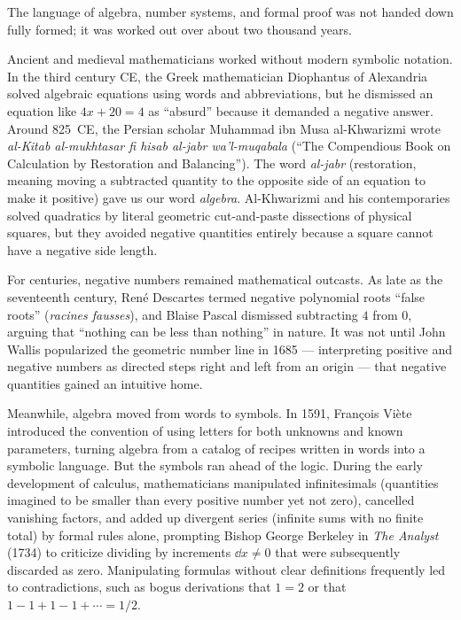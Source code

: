 \begin{historybox}
The language of algebra, number systems, and formal proof was not handed down
fully formed; it was worked out over about two thousand years.

Ancient and medieval mathematicians worked without modern symbolic notation. In the
third century CE, the Greek mathematician Diophantus of Alexandria solved algebraic
equations using words and abbreviations, but he dismissed an equation like $4x + 20 = 4$
as ``absurd'' because it demanded a negative answer. Around 825~CE, the Persian
scholar Muhammad ibn Musa al-Khwarizmi wrote \emph{al-Kitab al-mukhtasar fi hisab
al-jabr wa'l-muqabala} (``The Compendious Book on Calculation by Restoration and
Balancing''). The word \emph{al-jabr} (restoration, meaning moving a subtracted quantity
to the opposite side of an equation to make it positive) gave us our word
\emph{algebra}. Al-Khwarizmi and his contemporaries solved quadratics by literal
geometric cut-and-paste dissections of physical squares, but they avoided negative
quantities entirely because a square cannot have a negative side length.

For centuries, negative numbers remained mathematical outcasts. As late as the
seventeenth century, Ren\'e Descartes termed negative polynomial roots
``false roots'' (\emph{racines fausses}), and Blaise Pascal dismissed subtracting
$4$ from $0$, arguing that ``nothing can be less than nothing'' in nature. It was not
until John Wallis popularized the geometric number line in 1685 --- interpreting
positive and negative numbers as directed steps right and left from an
origin --- that negative quantities gained an intuitive home.

Meanwhile, algebra moved from words to symbols. In 1591,
Fran\c{c}ois Vi\`ete introduced the convention of using letters for both
unknowns and known parameters, turning algebra from a catalog of recipes written
in words into a symbolic language. But the symbols ran ahead of the logic.
During the early development of calculus, mathematicians manipulated
infinitesimals (quantities imagined to be smaller than every positive number yet
not zero), cancelled vanishing factors, and added up divergent series (infinite
sums with no finite total) by formal rules alone, prompting Bishop George Berkeley in \emph{The Analyst} (1734) to criticize
dividing by increments $\dd x \neq 0$ that were subsequently discarded as zero.
Manipulating formulas without clear definitions
frequently led to contradictions, such as bogus derivations that $1 = 2$ or that
$1 - 1 + 1 - 1 + \cdots = 1/2$.


\end{historybox}
